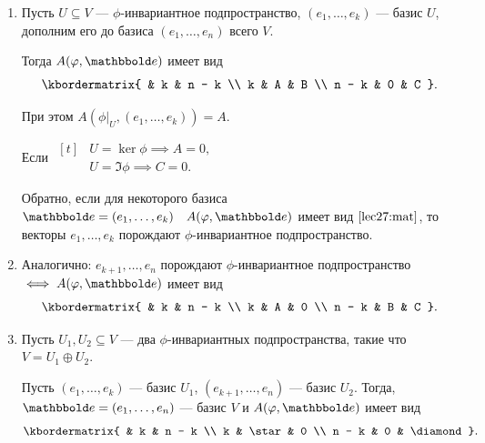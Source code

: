 \begin{enumerate}
    \item 
        Пусть $U \subseteq V$ --- $\phi$-инвариантное подпространство, $(e_1, \dots, e_k)$ --- базис $U$, дополним его до базиса $(e_1, \dots, e_n)$ всего $V$.
        
        Тогда $A(\phi, \E)$ имеет вид
        \begin{equation}
            \label{lec27:mat}
            \kbordermatrix{
                  & k & n - k \\
                k & A & B \\
                n - k & 0 & C
            }
        .\end{equation}

        При этом $A\left(\phi\big|_U, (e_1, \dots, e_k)\right) = A$.

        Если
        \begin{math}
            \begin{aligned}[t]
                &U = \ker \phi \implies A = 0, \\
                &U = \Im \phi \implies C = 0.
            \end{aligned}
        \end{math}

        Обратно, если для некоторого базиса $\E = (e_1, \dots, e_k) \quad A(\phi, \E)$ имеет вид $\eqref{lec27:mat}$, то векторы $e_1, \dots, e_k$ порождают $\phi$-инвариантное подпространство.

    \item
        Аналогично: $e_{k + 1}, \dots, e_n$ порождают $\phi$-инвариантное подпространство $\iff A(\phi, \E)$ имеет вид
        \begin{equation*}
            \kbordermatrix{
                  & k & n - k \\
                k & A & 0 \\
                n - k & B & C
            }
        .\end{equation*}

    \item 
        Пусть $U_1, U_2 \subseteq V$ --- два $\phi$-инвариантных подпространства, такие что $V = U_1 \oplus U_2$.
        
        Пусть $(e_1, \dots, e_k)$ --- базис $U_1$, $(e_{k + 1}, \dots, e_n)$ --- базис $U_2$.
        Тогда, $\E = (e_1, \dots, e_n)$ --- базис $V$ и $A(\phi, \E)$ имеет вид
        \begin{equation*}
            \kbordermatrix{
                      & k & n - k \\
                k     & \star & 0 \\
                n - k & 0 & \diamond
            }
        .\end{equation*}


\end{enumerate}

